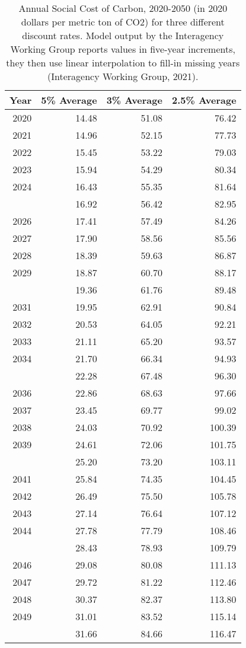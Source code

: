 \begin{table}

\caption{\label{tab:scc_values}Annual Social Cost of Carbon, 2020-2050 (in 2020 dollars per metric ton of CO2) for three different discount rates. Model output by the Interagency Working Group reports values in five-year increments, they then use linear interpolation to fill-in missing years (Interagency Working Group, 2021).}
\centering
\begin{tabular}[t]{rrrr}
\toprule
Year & 5\% Average & 3\% Average & 2.5\% Average\\
\midrule
2020 & 14.48 & 51.08 & 76.42\\
2021 & 14.96 & 52.15 & 77.73\\
2022 & 15.45 & 53.22 & 79.03\\
2023 & 15.94 & 54.29 & 80.34\\
2024 & 16.43 & 55.35 & 81.64\\
\addlinespace
2025 & 16.92 & 56.42 & 82.95\\
2026 & 17.41 & 57.49 & 84.26\\
2027 & 17.90 & 58.56 & 85.56\\
2028 & 18.39 & 59.63 & 86.87\\
2029 & 18.87 & 60.70 & 88.17\\
\addlinespace
2030 & 19.36 & 61.76 & 89.48\\
2031 & 19.95 & 62.91 & 90.84\\
2032 & 20.53 & 64.05 & 92.21\\
2033 & 21.11 & 65.20 & 93.57\\
2034 & 21.70 & 66.34 & 94.93\\
\addlinespace
2035 & 22.28 & 67.48 & 96.30\\
2036 & 22.86 & 68.63 & 97.66\\
2037 & 23.45 & 69.77 & 99.02\\
2038 & 24.03 & 70.92 & 100.39\\
2039 & 24.61 & 72.06 & 101.75\\
\addlinespace
2040 & 25.20 & 73.20 & 103.11\\
2041 & 25.84 & 74.35 & 104.45\\
2042 & 26.49 & 75.50 & 105.78\\
2043 & 27.14 & 76.64 & 107.12\\
2044 & 27.78 & 77.79 & 108.46\\
\addlinespace
2045 & 28.43 & 78.93 & 109.79\\
2046 & 29.08 & 80.08 & 111.13\\
2047 & 29.72 & 81.22 & 112.46\\
2048 & 30.37 & 82.37 & 113.80\\
2049 & 31.01 & 83.52 & 115.14\\
\addlinespace
2050 & 31.66 & 84.66 & 116.47\\
\bottomrule
\end{tabular}
\end{table}